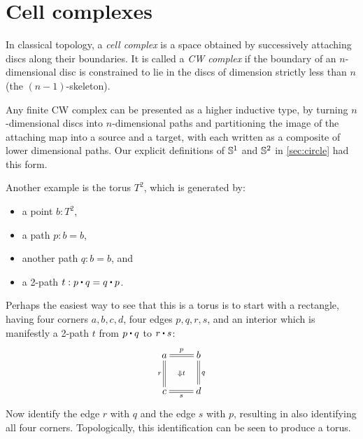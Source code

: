 %

\section{Cell complexes}
\label{sec:cell-complexes}

%
%
In classical topology, a \emph{cell complex} is a space obtained by successively attaching discs along their boundaries.
It is called a \emph{CW complex} if the boundary of an $n$-dimensional disc is constrained to lie in the discs of dimension strictly less than $n$ (the $(n-1)$-skeleton).

Any finite CW complex can be presented as a higher inductive type, by turning $n$-dimensional discs into $n$-dimensional paths and partitioning the image of the attaching map into a source and a target, with each written as a composite of lower dimensional paths.
Our explicit definitions of $\mathbb{S}^1$ and $\mathbb{S}^2$ in \cref{sec:circle} had this form.

%
Another example is the torus $T^2$, which is generated by:
\begin{itemize}
\item a point $b:T^2$,
\item a path $p:b=b$,
\item another path $q:b=b$, and
\item a 2-path $t: p\ct q = q \ct p$.
\end{itemize}
Perhaps the easiest way to see that this is a torus is to start with a rectangle, having four corners $a,b,c,d$, four edges $p,q,r,s$, and an interior which is manifestly a 2-path $t$ from $p\ct q$ to $r\ct s$:
\begin{equation*}
  \xymatrix{
      a\ar@{=}[r]^p\ar@{=}[d]_r \ar@{}[dr]|{\Downarrow t} &
      b\ar@{=}[d]^q\\
      c\ar@{=}[r]_s &
      d
      }
\end{equation*}
Now identify the edge $r$ with $q$ and the edge $s$ with $p$, resulting in also identifying all four corners.
Topologically, this identification can be seen to produce a torus.

